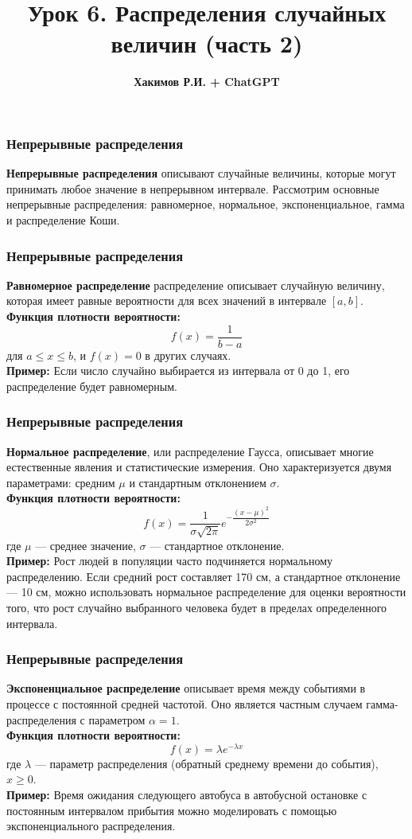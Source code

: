 \documentclass[aspectratio=169]{beamer}
\title{\bf Урок 6. Распределения случайных величин (часть 2)}
\author{{\bf Хакимов Р.И. + ChatGPT}}
\date[\today]{}
\begin{document}
\begin{frame}
\titlepage
\end{frame}

\begin{frame}
\frametitle{Непрерывные распределения}
{\bf Непрерывные распределения} описывают случайные величины, которые могут принимать любое значение в непрерывном интервале. Рассмотрим основные непрерывные распределения: равномерное, нормальное, экспоненциальное, гамма и распределение Коши.
\end{frame}

\begin{frame}
\frametitle{Непрерывные распределения}
{\bf Равномерное распределение} распределение описывает случайную величину, которая имеет равные вероятности для всех значений в интервале \([a, b]\).\\
{\bf Функция плотности вероятности:}
  \[
  f(x) = \frac{1}{b - a}
  \]
для \( a \leq x \leq b \), и \( f(x) = 0 \) в других случаях.\\
{\bf Пример:} Если число случайно выбирается из интервала от 0 до 1, его распределение будет равномерным.
\end{frame}

\begin{frame}
\frametitle{Непрерывные распределения}
{\bf Нормальное распределение}, или распределение Гаусса, описывает многие естественные явления и статистические измерения. Оно характеризуется двумя параметрами: средним \( \mu \) и стандартным отклонением \( \sigma \).\\
{\bf Функция плотности вероятности:}
  \[
  f(x) = \dfrac{1}{\sigma\sqrt{2 \pi }} e^{-\dfrac{(x - \mu)^2}{2 \sigma^2}}
  \]
где \( \mu \) — среднее значение, \( \sigma \) — стандартное отклонение.\\
{\bf Пример:} Рост людей в популяции часто подчиняется нормальному распределению. Если средний рост составляет 170 см, а стандартное отклонение — 10 см, можно использовать нормальное распределение для оценки вероятности того, что рост случайно выбранного человека будет в пределах определенного интервала.
\end{frame}

\begin{frame}
\frametitle{Непрерывные распределения}
{\bf Экспоненциальное распределение} описывает время между событиями в процессе с постоянной средней частотой. Оно является частным случаем гамма-распределения с параметром \( \alpha = 1 \).\\
{\bf Функция плотности вероятности:}
  \[
  f(x) = \lambda e^{-\lambda x}
  \]
где \( \lambda \) — параметр распределения (обратный среднему времени до события), \( x \geq 0 \).\\
{\bf Пример:} Время ожидания следующего автобуса в автобусной остановке с постоянным интервалом прибытия можно моделировать с помощью экспоненциального распределения.
\end{frame}
\end{document}
